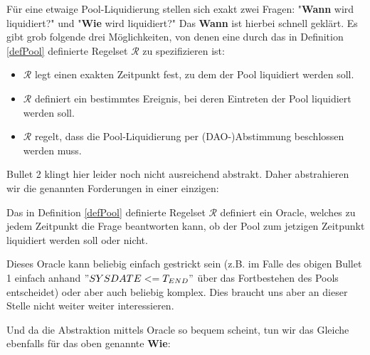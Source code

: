 
Für eine etwaige Pool-Liquidierung stellen sich exakt zwei Fragen: "\textbf{Wann} wird liquidiert?" und "\textbf{Wie} wird liquidiert?" Das \textbf{Wann} ist hierbei schnell geklärt. Es gibt grob folgende drei Möglichkeiten, von denen eine durch das in Definition \ref{defPool} definierte Regelset $\mathcal{R}$ zu spezifizieren ist:

\begin{itemize}
  \item $\mathcal{R}$ legt einen exakten Zeitpunkt fest, zu dem der Pool liquidiert werden soll.
  \item $\mathcal{R}$ definiert ein bestimmtes Ereignis, bei deren Eintreten der Pool liquidiert werden soll.
  \item $\mathcal{R}$ regelt, dass die Pool-Liquidierung per (DAO-)Abstimmung beschlossen werden muss.
\end{itemize}

\vspace{0.3cm}

Bullet 2 klingt hier leider noch nicht ausreichend abstrakt. Daher abstrahieren wir die genannten Forderungen in einer einzigen:

\vspace{0.2cm}

\begin{Fazit}

Das in Definition \ref{defPool} definierte Regelset $\mathcal{R}$ definiert ein Oracle, welches zu jedem Zeitpunkt die Frage beantworten kann, ob der Pool zum jetzigen Zeitpunkt liquidiert werden soll oder nicht. 

Dieses Oracle kann beliebig einfach gestrickt sein (z.B. im Falle des obigen Bullet 1 einfach anhand $"SYSDATE <= T_{END}"$ über das Fortbestehen des Pools entscheidet) oder aber auch beliebig komplex. Dies braucht uns aber an dieser Stelle nicht weiter weiter interessieren. 

\end{Fazit}

\vspace{0.3cm}

Und da die Abstraktion mittels Oracle so bequem scheint, tun wir das Gleiche ebenfalls für das oben genannte \textbf{Wie}:

\vspace{0.2cm}

